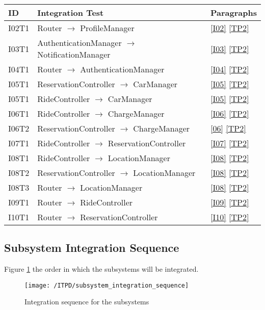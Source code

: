 	\begin{center}
		\vspace{0.6cm}
		\begin{tabular}{|l|l|l|}
			\hline
			\textbf{ID} & \textbf{Integration Test} & \textbf{Paragraphs} \bigstrut \\\hline
			\hline
			I02T1 & Router \ensuremath{\rightarrow} ProfileManager & \ref{I02}  \ref{TP2} \bigstrut \\\hline
			I03T1 & AuthenticationManager \ensuremath{\rightarrow} NotificationManager & \ref{I03}  \ref{TP2} \bigstrut \\\hline
			I04T1 & Router \ensuremath{\rightarrow} AuthenticationManager & \ref{I04}  \ref{TP2} \bigstrut \\\hline
			I05T1 & ReservationController \ensuremath{\rightarrow} CarManager & \ref{I05}  \ref{TP2} \bigstrut \\\hline
			I05T1 & RideController \ensuremath{\rightarrow} CarManager & \ref{I05}  \ref{TP2} \bigstrut \\\hline
			I06T1 & RideController \ensuremath{\rightarrow} ChargeManager & \ref{I06}  \ref{TP2} \bigstrut \\\hline
			I06T2 & ReservationController \ensuremath{\rightarrow} ChargeManager & \ref{06}  \ref{TP2} \bigstrut \\\hline
			I07T1 & RideController \ensuremath{\rightarrow} ReservationController & \ref{I07}  \ref{TP2} \bigstrut \\\hline
			I08T1 & RideController \ensuremath{\rightarrow} LocationManager & \ref{I08}  \ref{TP2} \bigstrut \\\hline
			I08T2 & ReservationController \ensuremath{\rightarrow} LocationManager & \ref{I08}  \ref{TP2} \bigstrut \\\hline
			I08T3 & Router \ensuremath{\rightarrow} LocationManager & \ref{I08}  \ref{TP2} \bigstrut \\\hline
			I09T1 & Router \ensuremath{\rightarrow} RideController & \ref{I09}  \ref{TP2} \bigstrut \\\hline
			I10T1 & Router \ensuremath{\rightarrow} ReservationController & \ref{I10}  \ref{TP2} \bigstrut \\\hline
		\end{tabular}
	\end{center}

	\newpage
	\subsection{Subsystem Integration Sequence}
	Figure \ref{fig:subsystem_integration_sequence} the order in which the subsystems will be integrated.

	\begin{figure}[!ht]
	  \centering
	  \vspace{0.2cm}
	  \texttt{[image: /ITPD/subsystem\_integration\_sequence]}\\
	  \vspace{0.2cm}
	  \caption{Integration sequence for the subsystems} 
	  \label{fig:subsystem_integration_sequence} 
	\end{figure}
